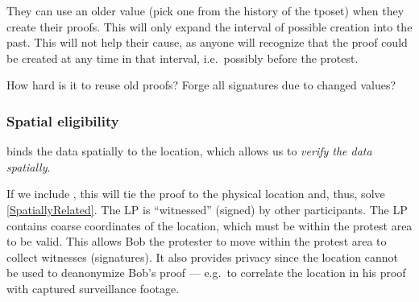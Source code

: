 They can use an older value (pick one from the history of the \ac{tposet}) when 
they create their proofs.
This will only expand the interval of possible creation into the past.
This will not help their cause, as anyone will recognize that the proof could 
be created at any time in that interval, i.e.\ possibly before the protest.


\begin{question}
  How hard is it to reuse old proofs?
  Forge all signatures due to changed values?
\end{question}

\subsubsection{Spatial eligibility}

 binds the data spatially to the location, which allows 
us to \emph{verify the data spatially}.

If we include , this will tie the proof to the physical location and, 
thus, solve \cref{SpatiallyRelated}.
The \ac{LP} is \enquote{witnessed} (signed) by other participants.
The \ac{LP} contains coarse coordinates of the location, which must be within 
the protest area to be valid.
This allows Bob the protester to move within the protest area to collect 
witnesses (signatures).
It also provides privacy since the location cannot be used to deanonymize Bob's 
proof --- e.g.\ to correlate the location in his proof with captured 
surveillance footage.


